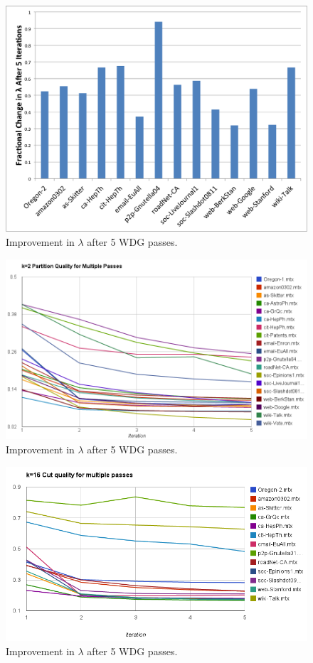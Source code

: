 \documentclass[11pt]{article}
\begin{document}
\begin{figure}[h]
\centering
\includegraphics[scale=0.7] {figures/fracLambda.png}
\caption[Caption for]{Improvement in $\lambda$ after 5 WDG passes.}
\end{figure}

\begin{figure}[h]
\centering
\includegraphics[scale=0.55] {figures/2partlambda}
\caption[Caption for]{Improvement in $\lambda$ after 5 WDG passes.}
\end{figure}

\begin{figure}[h]
\centering
\includegraphics[scale=0.65] {figures/16partlambda}
\caption[Caption for]{Improvement in $\lambda$ after 5 WDG passes.}
\end{figure}
\end{document}
